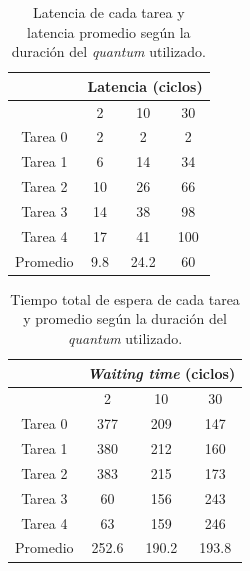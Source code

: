 \begin{table}[H]
  \center
  \begin{center}
  \begin{tabular}{c|c|c|c|}
    \cline{2-4}
    & \multicolumn{3}{|c|}{\cellcolor{LightCyan}Latencia (ciclos)} \\
    \hline
    \rowcolor{LightCyan}
    \multicolumn{1}{|c|}{Quantum} & 2 & 10 & 30 \\
    \hline
    \multicolumn{1}{|c|}{\cellcolor{LightCyan}Tarea 0} & 2 & 2 & 2 \\
    \multicolumn{1}{|c|}{\cellcolor{LightCyan}Tarea 1} & 6 & 14 & 34 \\
    \multicolumn{1}{|c|}{\cellcolor{LightCyan}Tarea 2} & 10 & 26 & 66 \\
    \multicolumn{1}{|c|}{\cellcolor{LightCyan}Tarea 3} & 14 & 38 & 98 \\
    \multicolumn{1}{|c|}{\cellcolor{LightCyan}Tarea 4} & 17 & 41 & 100 \\
    \hline
    \multicolumn{1}{|c|}{\cellcolor{LightCyan}Promedio} & 9.8 & 24.2 & 60 \\
    \hline
  \end{tabular}
  \end{center}
  \caption{\footnotesize Latencia de cada tarea y latencia promedio según la duración del \emph{quantum} utilizado.}
  \label{tab:ej5-1}
\end{table}

\begin{table}[H]
  \center
  \begin{center}
  \begin{tabular}{c|c|c|c|}
    \cline{2-4}
    & \multicolumn{3}{|c|}{\cellcolor{LightCyan}\emph{Waiting time} (ciclos)} \\
    \hline
    \rowcolor{LightCyan}
    \multicolumn{1}{|c|}{Quantum} & 2 & 10 & 30 \\
    \hline
    \multicolumn{1}{|c|}{\cellcolor{LightCyan}Tarea 0} & 377 & 209 & 147 \\
    \multicolumn{1}{|c|}{\cellcolor{LightCyan}Tarea 1} & 380 & 212 & 160 \\
    \multicolumn{1}{|c|}{\cellcolor{LightCyan}Tarea 2} & 383 & 215 & 173 \\
    \multicolumn{1}{|c|}{\cellcolor{LightCyan}Tarea 3} & 60 & 156 & 243 \\
    \multicolumn{1}{|c|}{\cellcolor{LightCyan}Tarea 4} & 63 & 159 & 246 \\
    \hline
    \multicolumn{1}{|c|}{\cellcolor{LightCyan}Promedio} & 252.6 & 190.2 & 193.8 \\
    \hline
  \end{tabular}
  \end{center}
  \caption{\footnotesize Tiempo total de espera de cada tarea y promedio según la duración del \emph{quantum} utilizado.}
  \label{tab:ej5-2}
\end{table}

